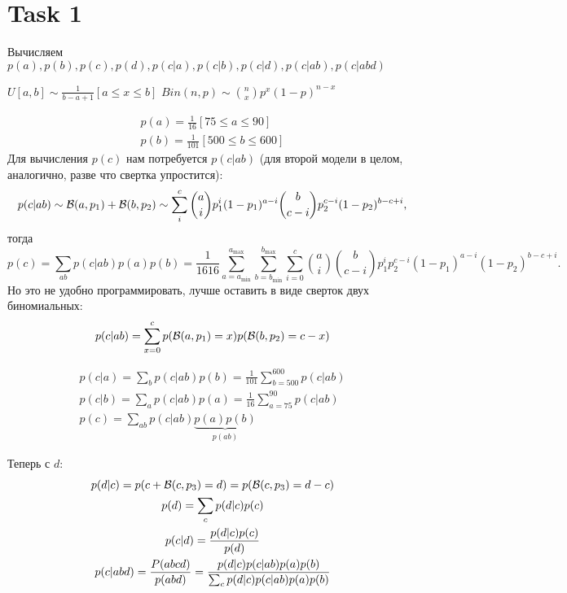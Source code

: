 \section{Task 1}

\begin{task}
    Вычисляем $p(a), p(b), p(c), p(d), p(c|a), p(c|b), p(c|d), p(c|ab), p(c|abd)$
\end{task}

\begin{solution}
    \begin{remark}
        $U[a,b] \sim \frac{1}{b - a + 1}[a \le x \le b]$
        $Bin(n, p) \sim {n \choose x} p^x (1 - p)^{n - x}$
    \end{remark}

    \begin{gather}
        p(a) = \frac{1}{16}[75 \le a \le 90] \\
        p(b) = \frac{1}{101}[500 \le b \le 600]
    \end{gather}
    Для вычисления $p(c)$ нам потребуется $p(c|ab)$ (для второй модели в целом, аналогично, разве что свертка упростится):
    \begin{equation}
        p(c|ab) \sim \mathcal{B}(a, p_1) + \mathcal{B}(b, p_2) \sim \sum_i^c {a \choose i} p_1^i (1 - p_1)^{a - i} {b \choose c - i} p_2^{c - i} (1 - p_2)^{b - c + i},
    \end{equation}
    тогда
    \begin{equation}
        p(c) = \sum_{ab} p(c|ab)p(a)p(b) = \frac{1}{1616} \sum_{a = a_{\min}}^{a_{\max}} \sum_{b = b_{\min}}^{b_{\max}} \sum_{i = 0}^c {a \choose i} {b \choose c - i} p_1^i p_2^{c - i} (1 - p_1)^{a - i} (1 - p_2)^{b - c + i}.
    \end{equation}
    Но это не удобно программировать, лучше оставить в виде сверток двух биномиальных:
    \begin{equation}
        p(c|ab) = \sum_{x = 0}^c p(\mathcal{B}(a, p_1) = x) p(\mathcal{B}(b, p_2) = c - x)
    \end{equation}

    \begin{gather}
        p(c|a) = \sum_b p(c|ab)p(b) = \frac{1}{101} \sum_{b = 500}^{600} p(c|ab) \\
        p(c|b) = \sum_a p(c|ab)p(a) = \frac{1}{16} \sum_{a = 75}^{90} p(c|ab) \\
        p(c) = \sum_{ab} p(c|ab) \underbrace{p(a)p(b)}_{p(ab)}
    \end{gather}

    Теперь с $d$:
    \begin{gather}
        p(d|c) = p(c + \mathcal{B}(c, p_3) = d) = p(\mathcal{B}(c, p_3) = d - c) \\
        p(d) = \sum_c p(d|c)p(c) \\
        p(c|d) = \frac{p(d|c) p(c)}{p(d)} \\
        p(c|abd) = \frac{P(abcd)}{p(abd)} = \frac{p(d|c) p(c|ab) p(a) p(b)}{\sum_c p(d|c) p(c|ab) p(a) p(b)}
    \end{gather}
\end{solution}
